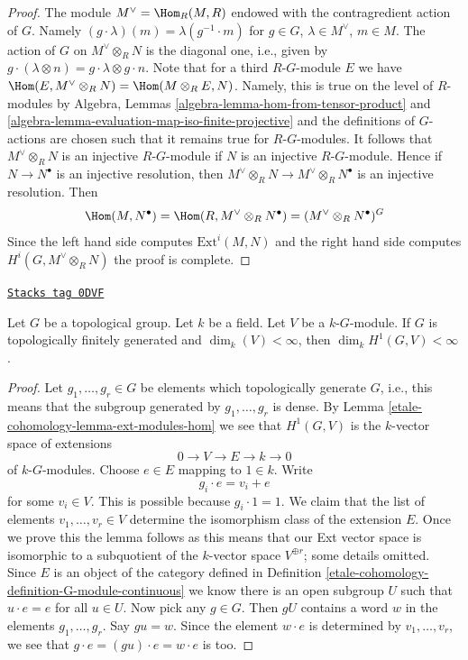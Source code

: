 \begin{proof}
The module $M^\vee = \Hom_R(M, R)$ endowed with the contragredient
action of $G$. Namely $(g \cdot \lambda)(m) = \lambda(g^{-1} \cdot m)$
for $g \in G$, $\lambda \in M^\vee$, $m \in M$. The action of $G$ on
$M^\vee \otimes_R N$ is the diagonal one, i.e., given by
$g \cdot (\lambda \otimes n) = g \cdot \lambda \otimes g \cdot n$.
Note that for a third $R\text{-}G$-module $E$ we have
$\Hom(E, M^\vee \otimes_R N) = \Hom(M \otimes_R E, N)$.
Namely, this is true on the level of $R$-modules by
Algebra, Lemmas \ref{algebra-lemma-hom-from-tensor-product} and
\ref{algebra-lemma-evaluation-map-iso-finite-projective}
and the definitions of $G$-actions are chosen such that it
remains true for $R\text{-}G$-modules. It follows that
$M^\vee \otimes_R N$ is an injective $R\text{-}G$-module
if $N$ is an injective $R\text{-}G$-module. Hence if
$N \to N^\bullet$ is an injective resolution, then
$M^\vee \otimes_R N \to M^\vee \otimes_R N^\bullet$
is an injective resolution. Then
$$
\Hom(M, N^\bullet) = \Hom(R, M^\vee \otimes_R N^\bullet) =
(M^\vee \otimes_R N^\bullet)^G
$$
Since the left hand side computes $\text{Ext}^i(M, N)$ and the right
hand side computes $H^i(G, M^\vee \otimes_R N)$ the proof is complete.
\end{proof}

\begin{lemma}
\label{etale-cohomology-lemma-finite-dim-group-cohomology}
\href{https://stacks.math.columbia.edu/tag/0DVF}{\texttt{Stacks tag 0DVF}}

Let $G$ be a topological group. Let $k$ be a field.
Let $V$ be a $k\text{-}G$-module.
If $G$ is topologically finitely generated and
$\dim_k(V) < \infty$, then $\dim_k H^1(G, V) < \infty$.
\end{lemma}

\begin{proof}
Let $g_1, \ldots, g_r \in G$ be elements which topologically generate $G$,
i.e., this means that the subgroup generated by $g_1, \ldots, g_r$ is dense.
By Lemma \ref{etale-cohomology-lemma-ext-modules-hom}
we see that $H^1(G, V)$ is the $k$-vector space of extensions
$$
0 \to V \to E \to k \to 0
$$
of $k\text{-}G$-modules. Choose $e \in E$ mapping to $1 \in k$.
Write
$$
g_i \cdot e = v_i + e
$$
for some $v_i \in V$. This is possible because $g_i \cdot 1 = 1$.
We claim that the list of elements $v_1, \ldots, v_r \in V$
determine the isomorphism class of the extension $E$.
Once we prove this the lemma follows as this means that our
Ext vector space is isomorphic to a subquotient of the $k$-vector
space $V^{\oplus r}$; some details omitted.
Since $E$ is an object of the category defined in
Definition \ref{etale-cohomology-definition-G-module-continuous}
we know there is an open subgroup $U$ such that
$u \cdot e = e$ for all $u \in U$.
Now pick any $g \in G$. Then $gU$ contains a word $w$ in
the elements $g_1, \ldots, g_r$.
Say $gu = w$. Since the element $w \cdot e$ is determined by
$v_1, \ldots, v_r$, we see that $g \cdot e = (gu) \cdot e = w \cdot e$
is too.
\end{proof}

